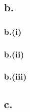 \documentclass[12pt]{article}
\begin{document}
\subsection{b.}
\subsubsection{b.(i)}
\subsubsection{b.(ii)}
\subsubsection{b.(iii)}




\subsection{c.}
%
% 
% 
\end{document}
